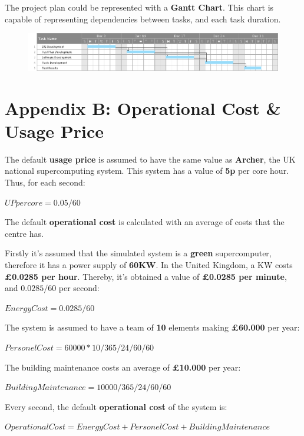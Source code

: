 \documentclass{scrreprt}
\begin{document}
The project plan could be represented with a \textbf{Gantt Chart}. This chart is capable of representing dependencies between tasks, and each task duration.
\begin{figure}[!htb]
  \centering
  \includegraphics[width=\linewidth]{ProjectPlan.png}
\end{figure}

\section{Appendix B: Operational Cost \& Usage Price}

\par The default \textbf{usage price} is assumed to have the same value as \textbf{Archer}, the UK national supercomputing system. This system has a value of \textbf{5p} per core hour. Thus, for each second:

\begin{center}
	$
		UP per core = 0.05 / 60
	$
\end{center}

\par The default \textbf{operational cost} is calculated with an average of costs that the centre has. 
\par Firstly it's assumed that the simulated system is a \textbf{green} supercomputer, therefore it has a power supply of \textbf{60KW}. In the United Kingdom, a KW costs \textbf{£0.0285 per hour}. Thereby, it's obtained a value of \textbf{£0.0285 per minute}, and $0.0285 / 60$ per second:
\begin{center}
	$
		Energy Cost = 0.0285 / 60
	$
\end{center}
The system is assumed to have a team of \textbf{10} elements making \textbf{£60.000} per year:
\begin{center}
	$
		Personel Cost = 60000 * 10 / 365 / 24 / 60 / 60
	$
\end{center}
The building maintenance costs an average of \textbf{£10.000} per year:
\begin{center}
	$
		Building Maintenance = 10000 / 365 / 24 / 60 / 60
	$
\end{center}
Every second, the default \textbf{operational cost} of the system is:
\begin{center}
	$
		Operational Cost = Energy Cost + Personel Cost + Building Maintenance
	$
\end{center}
\end{document}
